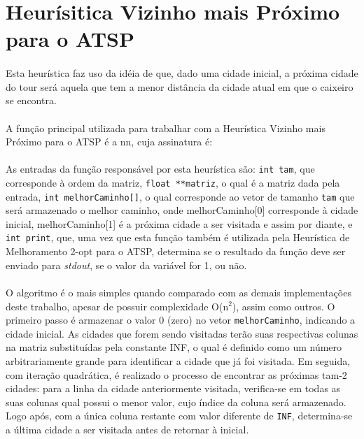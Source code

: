 \documentclass[12pt,a4paper]{article}
\begin{document}
 \section{Heurísitica Vizinho mais Próximo para o ATSP}
  {\paragraph{} Esta heurística faz uso da idéia de que, dado uma cidade inicial, a próxima cidade do tour será aquela que tem a menor distância da cidade atual em que o caixeiro se encontra.}
  {\paragraph{} A função principal utilizada para trabalhar com a Heurística Vizinho mais Próximo para o ATSP é a nn, cuja assinatura é: }
  {\paragraph{} As entradas da função responsável por esta heurística são: {\tt int tam}, que corresponde à ordem da matriz, {\tt float **matriz}, o qual é a matriz dada pela entrada, {\tt int melhorCaminho[]}, o qual corresponde ao vetor de tamanho {\tt tam} que será armazenado o melhor caminho, onde melhorCaminho[0] corresponde à cidade inicial, melhorCaminho[1] é a próxima cidade a ser visitada e assim por diante, e {\tt int print}, que, uma vez que esta função também é utilizada pela Heurística de Melhoramento 2-opt para o ATSP, determina se o resultado da função deve ser enviado para {\it stdout}, se o valor da variável for 1, ou não.}
  {\paragraph{} O algoritmo é o mais simples quando comparado com as demais implementações deste trabalho, apesar de possuir complexidade O(n$^2$), assim como outros. O primeiro passo é armazenar o valor 0 (zero) no vetor {\tt melhorCaminho}, indicando a cidade inicial. As cidades que forem sendo visitadas terão suas respectivas colunas na matriz substituídas pela constante INF, o qual é definido como um número arbitrariamente grande para identificar a cidade que já foi visitada. Em seguida, com iteração quadrática, é realizado o processo de encontrar as próximas tam-2 cidades: para a linha da cidade anteriormente visitada, verifica-se em todas as suas colunas qual possui o menor valor, cujo índice da coluna será armazenado. Logo após, com a única coluna restante com valor diferente de {\tt INF}, determina-se a última cidade a ser visitada antes de retornar à inicial.}
\end{document}
